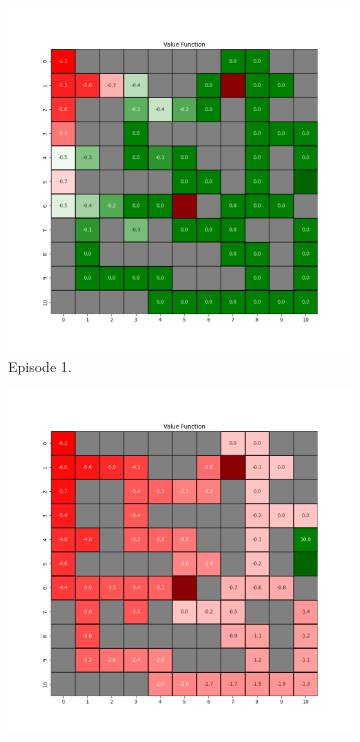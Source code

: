 \documentclass{assignment}
\begin{document}
\begin{figure}[H]
    \begin{subfigure}{0.3\textwidth}
        \includegraphics[width=\textwidth]{figures/value_q/epsilon_sweep/value_function_alpha_0.1_gamma_0.95_epsilon_0.8_iteration_1.png}
    \caption{Episode 1.}
    \end{subfigure}\hfill
    \begin{subfigure}{0.3\textwidth}
        \includegraphics[width=\textwidth]{figures/value_q/epsilon_sweep/value_function_alpha_0.1_gamma_0.95_epsilon_0.8_iteration_50.png}

\end{subfigure}
\end{figure}
\end{document}
